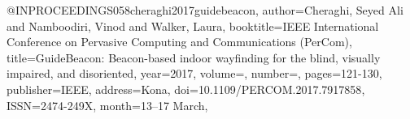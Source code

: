 @INPROCEEDINGS{058cheraghi2017guidebeacon,
author={Cheraghi, Seyed Ali and Namboodiri, Vinod and Walker, Laura},
booktitle={IEEE International Conference on Pervasive Computing and Communications (PerCom)}, 
title={GuideBeacon: Beacon-based indoor wayfinding for the blind, visually impaired, and disoriented}, 
year={2017},
volume={},
number={},
pages={121-130},
publisher={IEEE},
address={Kona},
doi={10.1109/PERCOM.2017.7917858},
ISSN={2474-249X},
month={13--17 March},}